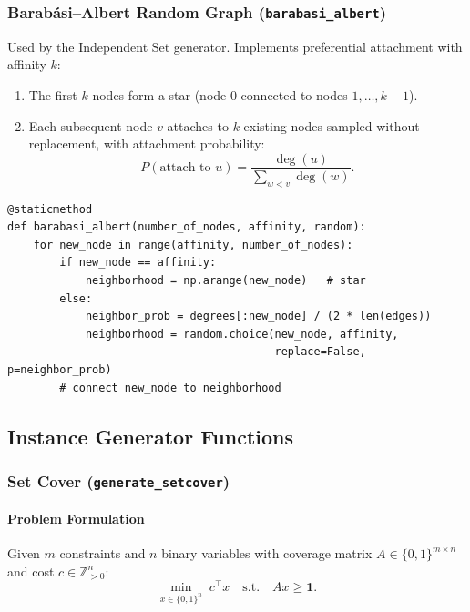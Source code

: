 \subsubsection{Barab\'asi--Albert Random Graph (\texttt{barabasi\_albert})}

Used by the Independent Set generator. Implements preferential attachment with affinity $k$:

\begin{enumerate}
    \item The first $k$ nodes form a star (node 0 connected to nodes $1,\ldots,k-1$).
    \item Each subsequent node $v$ attaches to $k$ existing nodes sampled without replacement, with attachment probability:
    \begin{equation}
        P(\text{attach to }u) = \frac{\deg(u)}{\sum_{w < v} \deg(w)}.
    \end{equation}
\end{enumerate}

\begin{lstlisting}
@staticmethod
def barabasi_albert(number_of_nodes, affinity, random):
    for new_node in range(affinity, number_of_nodes):
        if new_node == affinity:
            neighborhood = np.arange(new_node)   # star
        else:
            neighbor_prob = degrees[:new_node] / (2 * len(edges))
            neighborhood = random.choice(new_node, affinity,
                                         replace=False, p=neighbor_prob)
        # connect new_node to neighborhood
\end{lstlisting}

\subsection{Instance Generator Functions}

\subsubsection{Set Cover (\texttt{generate\_setcover})}

\paragraph{Problem Formulation}

Given $m$ constraints and $n$ binary variables with coverage matrix $A \in \{0,1\}^{m \times n}$ and cost $c \in \mathbb{Z}_{>0}^n$:
\begin{equation}
    \min_{x \in \{0,1\}^n}\; c^\top x \quad \text{s.t.}\quad Ax \geq \mathbf{1}.
\end{equation}

